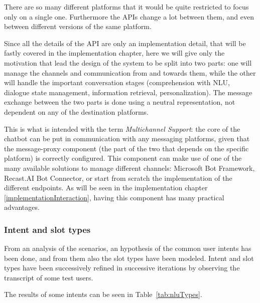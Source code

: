 There are so many different platforms that it would be quite restricted to focus only on a single one. Furthermore the APIs change a lot between them, and even between different versions of the same platform.

Since all the details of the API are only an implementation detail, that will be fastly covered in the implementation chapter, here we will give only the motivation that lead the design of the system to be split into two parts: one will manage the channels and communication from and towards them, while the other will handle the important conversation stages (comprehension with NLU, dialogue state management, information retrieval, personalization). The message exchange between the two parts is done using a neutral representation, not dependent on any of the destination platforms.

This is what is intended with the term \textit{Multichannel Support}: the core of the chatbot can be put in communication with any messaging platforms, given that the message-proxy component (the part of the two that depends on the specific platform) is correctly configured. This component can make use of one of the many available solutions to manage different channels: Microsoft Bot Framework, Recast.AI Bot Connector, or start from scratch the implementation of the different endpoints. As will be seen in the implementation chapter \ref{implementationInteraction}, having this component has many practical advantages.

\subsubsection{Intent and slot types}
\label{approachTypes}

From an analysis of the scenarios, an hypothesis of the common user intents has been done, and from them also the slot types have been modeled. Intent and slot types have been successively refined in successive iterations by observing the transcript of some test users.

The results of some intents can be seen in Table~\ref{tab:nluTypes}.


